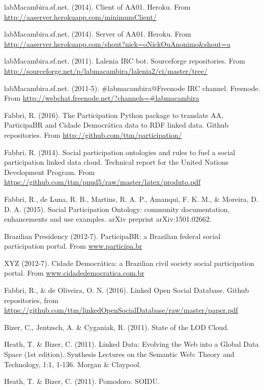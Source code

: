 \documentclass[12pt,fleqn]{article}
\begin{document}
\begin{thebibliography}{99}
	labMacambira.sf.net. (2014). Client of AA01.
		Heroku. From \url{http://aaserver.herokuapp.com/minimumClient/}

	labMacambira.sf.net. (2014). Server of AA01.
		Heroku. From \url{http://aaserver.herokuapp.com/shout?nick=oNickOuAnonimo&shout=a}

	labMacambira.sf.net. (2011). Lalenia IRC bot.
		Sourceforge repositories. From \url{http://sourceforge.net/p/labmacambira/lalenia2/ci/master/tree/}

	labMacambira.sf.net. (2011-5). \#labmacambira@Freenode IRC channel.
		Freenode. From \url{http://webchat.freenode.net/?channels=#labmacambira}


	Fabbri, R. (2016). The Participation Python package to translate AA, ParticipaBR and Cidade Democrática data to RDF linked data.
		Github repositories. From \url{http://github.com/ttm/participation/}

Fabbri, R. (2014). Social participation ontologies and rules to fuel a social participation linked data cloud.
	Technical report for the United Nations Development Program.
		From \url{https://github.com/ttm/pnud5/raw/master/latex/produto.pdf}

Fabbri, R., de Luna, R. B., Martins, R. A. P., Amanqui, F. K. M., \& Moreira, D. D. A. (2015). Social Participation Ontology: community documentation, enhancements and use examples. arXiv preprint arXiv:1501.02662.

Brazilian Presidency (2012-7). ParticipaBR: a Brazilian federal social participation portal. 
From \url{www.participa.br}

XYZ (2012-7). Cidade Democrática: a Brazilian civil society social participation portal. 
From \url{www.cidadedemocratica.com.br}

	Fabbri, R., \& de Oliveira, O. N. (2016). Linked Open Social Database. Github repositories, from \url{https://github.com/ttm/linkedOpenSocialDatabase/raw/master/paper.pdf}

	Bizer, C., Jentzsch, A. \& Cyganiak, R. (2011). State of the LOD Cloud. 

	Heath, T. \& Bizer, C. (2011). Linked Data: Evolving the Web into a Global Data Space (1st edition). Synthesis Lectures on the Semantic Web: Theory and Technology, 1:1, 1-136. Morgan \& Claypool.

	Heath, T. \& Bizer, C. (2011). Pomodoro. SOIDU.

\end{thebibliography}
\end{document}
